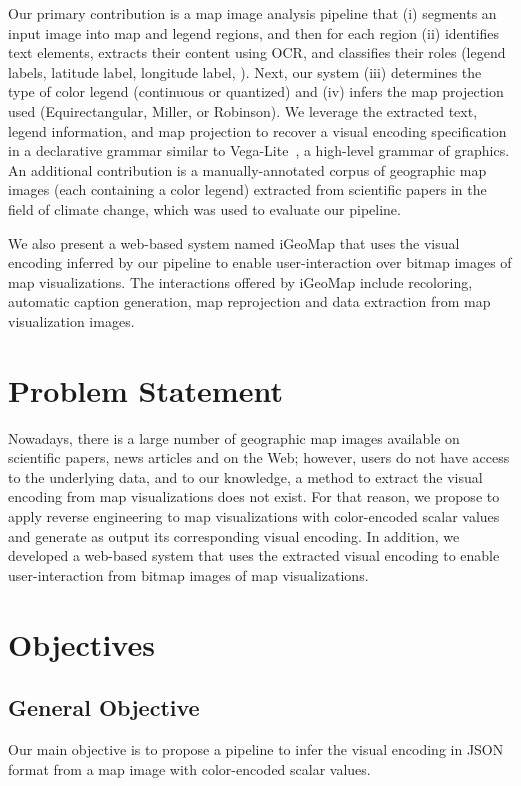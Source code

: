 Our primary contribution is a map image analysis pipeline that (i) segments an input image into map and legend regions, and then for each region (ii) identifies text elements, extracts their content using \ac{OCR}, and classifies their roles (\eg legend labels, latitude label, longitude label, \etc). Next, our system (iii) determines the type of color legend (\eg continuous or quantized) and (iv) infers the map projection used (\eg Equirectangular, Miller, or Robinson).
We leverage the extracted text, legend information, and map projection to recover a visual encoding specification in a declarative grammar similar to Vega-Lite~\citep{Satyanarayan2017}, a high-level grammar of graphics. 
An additional contribution is a manually-annotated corpus of geographic map images (each containing a color legend) extracted from scientific papers in the field of climate change, which was used to evaluate our pipeline.

We also present a web-based system named iGeoMap that uses the visual encoding inferred by our pipeline to enable user-interaction over bitmap images of map visualizations. The interactions offered by iGeoMap include recoloring, automatic caption generation, map reprojection and data extraction from map visualization images.


\section{Problem Statement}
\label{sec:problem}
Nowadays, there is a large number of geographic map images available on scientific papers, news articles and on the Web; however, users do not have access to the underlying data, and to our knowledge, a method to extract the visual encoding from map visualizations does not exist. For that reason, we propose to apply reverse engineering to map visualizations with color-encoded scalar values and generate as output its corresponding visual encoding. In addition, we developed a web-based system that uses the extracted visual encoding to enable user-interaction from bitmap images of map visualizations.


\section{Objectives}
\label{sec:objectives}

\subsection*{General Objective}
Our main objective is to propose a pipeline to infer the visual encoding in \ac{JSON} format from a map image with color-encoded scalar values. 


